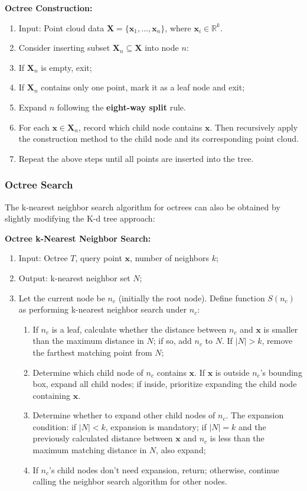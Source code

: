 \begin{mdframed}
	\textbf{Octree Construction:}
	\begin{enumerate}
		\item Input: Point cloud data $\bm{X} = \{\bm{x}_1, \ldots, \bm{x}_n\}$, where $\bm{x}_i \in \mathbb{R}^{k}$.
		\item Consider inserting subset $\bm{X}_n \subseteq \bm{X}$ into node $n$:
		\item If $\bm{X}_n$ is empty, exit;
		\item If $\bm{X}_n$ contains only one point, mark it as a leaf node and exit;
		\item Expand $n$ following the \textbf{eight-way split} rule.
		\item For each $\bm{x} \in \bm{X}_n$, record which child node contains $\bm{x}$. Then recursively apply the construction method to the child node and its corresponding point cloud.
		\item Repeat the above steps until all points are inserted into the tree.
	\end{enumerate}
\end{mdframed}

\subsubsection{Octree Search}
The k-nearest neighbor search algorithm for octrees can also be obtained by slightly modifying the K-d tree approach:

\begin{mdframed}
	\textbf{Octree k-Nearest Neighbor Search:}
	\begin{enumerate}
		\item Input: Octree $T$, query point $\bm{x}$, number of neighbors $k$;
		\item Output: k-nearest neighbor set $N$;
		\item Let the current node be $n_c$ (initially the root node). Define function $S(n_c)$ as performing k-nearest neighbor search under $n_c$:
		\begin{enumerate}
			\item If $n_c$ is a leaf, calculate whether the distance between $n_c$ and $\bm{x}$ is smaller than the maximum distance in $N$; if so, add $n_c$ to $N$. If $|N| > k$, remove the farthest matching point from $N$;
			\item Determine which child node of $n_c$ contains $\bm{x}$. If $\bm{x}$ is outside $n_c$'s bounding box, expand all child nodes; if inside, prioritize expanding the child node containing $\bm{x}$.
			\item Determine whether to expand other child nodes of $n_c$. The expansion condition: if $|N|<k$, expansion is mandatory; if $|N|=k$ and the previously calculated distance between $\bm{x}$ and $n_c$ is less than the maximum matching distance in $N$, also expand;
			\item If $n_c$'s child nodes don't need expansion, return; otherwise, continue calling the neighbor search algorithm for other nodes.
		\end{enumerate}
	\end{enumerate}
\end{mdframed}

